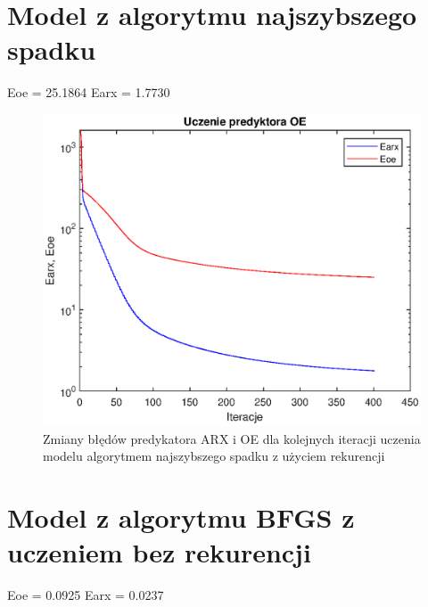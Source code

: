 		\newpage
	\section{Model z algorytmu najszybszego spadku}
		\label{sec:naj_sp}
		Eoe = 25.1864
		Earx = 1.7730
		
		\begin{figure}[h!]
			\centering
			\includegraphics[width=\linewidth]{img/NS_OE_p.eps}
			\caption{Zmiany błędów predykatora ARX i OE dla kolejnych iteracji uczenia modelu algorytmem najszybszego spadku z użyciem rekurencji}
			\label{fig:ns_oe_p}
		\end{figure}
		
		\newpage
	\section{Model z algorytmu BFGS z uczeniem bez rekurencji}
		\label{sec:bfgs_arx}
		Eoe = 0.0925
		Earx = 0.0237
		
